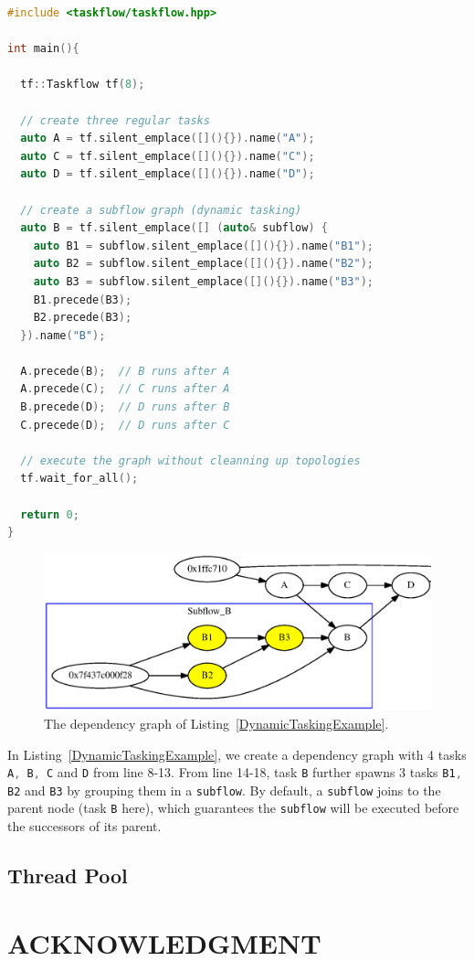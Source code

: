 \documentclass[sigconf]{acmart}
\def\codeinline{\lstinline[basicstyle=\normalsize\color{darkgray},language=C++]}
\begin{document}
\begin{lstlisting}[language=C++,label=DynamicTaskingExample,caption={A dynamic tasking example.}]
#include <taskflow/taskflow.hpp>  

int main(){

  tf::Taskflow tf(8);  

  // create three regular tasks
  auto A = tf.silent_emplace([](){}).name("A");
  auto C = tf.silent_emplace([](){}).name("C");
  auto D = tf.silent_emplace([](){}).name("D");
  
  // create a subflow graph (dynamic tasking)
  auto B = tf.silent_emplace([] (auto& subflow) {
    auto B1 = subflow.silent_emplace([](){}).name("B1");
    auto B2 = subflow.silent_emplace([](){}).name("B2");
    auto B3 = subflow.silent_emplace([](){}).name("B3");
    B1.precede(B3);
    B2.precede(B3);
  }).name("B");
              
  A.precede(B);  // B runs after A 
  A.precede(C);  // C runs after A 
  B.precede(D);  // D runs after B 
  C.precede(D);  // D runs after C 
  
  // execute the graph without cleanning up topologies
  tf.wait_for_all();

  return 0;
}
\end{lstlisting} 

\begin{figure}[htb]
 \centering
 \includegraphics[width=1.0\columnwidth]{Fig/dynamic.eps}
  \caption{
    The dependency graph of Listing~\ref{DynamicTaskingExample}.
  }
 \label{fig::dynamic}
\end{figure}

In Listing~\ref{DynamicTaskingExample}, we create a dependency graph with 4
tasks \codeinline{A, B, C} and \codeinline{D} from line 8-13. From line 14-18,
task \codeinline{B} further spawns 3 tasks \codeinline{B1, B2} and
\codeinline{B3} by grouping them in a \codeinline{subflow}. By default, a
\codeinline{subflow} joins to the parent node (task \codeinline{B} here), which 
guarantees the \codeinline{subflow} will be executed before the successors of its parent.


\subsection{Thread Pool}


\section{ACKNOWLEDGMENT}




%
%


\end{document}
